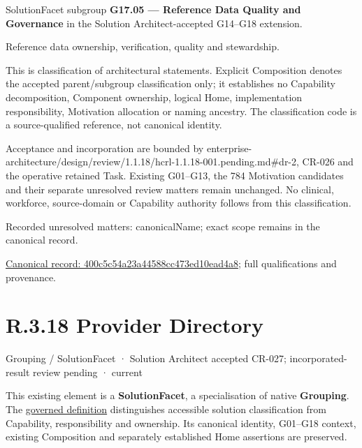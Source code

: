 SolutionFacet subgroup \textbf{G17.05 — Reference Data Quality and Governance} in the Solution Architect-accepted G14–G18 extension.



Reference data ownership, verification, quality and stewardship.



This is classification of architectural statements. Explicit Composition denotes the accepted parent/subgroup classification only; it establishes no Capability decomposition, Component ownership, logical Home, implementation responsibility, Motivation allocation or naming ancestry. The classification code is a source-qualified reference, not canonical identity.



Acceptance and incorporation are bounded by enterprise-architecture/design/review/1.1.18/hcrl-1.1.18-001.pending.md\#dr-2, CR-026 and the operative retained Task. Existing G01–G13, the 784 Motivation candidates and their separate unresolved review matters remain unchanged. No clinical, workforce, source-domain or Capability authority follows from this classification.


{\small Recorded unresolved matters: canonicalName; exact scope remains in the canonical record.}\par
{\footnotesize \href{../../../../../../../continuum/grouping/400c5c54a23a44588cc473ed10ead4a8.md}{Canonical record: 400c5c54a23a44588cc473ed10ead4a8}; full qualifications and provenance.}\par
\section*{R.3.18 Provider Directory}
\label{navigation:R.3.18}

\label{element:0233415953ed487fbbe407ebb469e7bc}
{\small Grouping / SolutionFacet · Solution Architect accepted CR-027; incorporated-result review pending · current}\par

This existing element is a \textbf{SolutionFacet}, a specialisation of native
\textbf{Grouping}. The \href{\detokenize{../../../../../../../governance/continuum-representation.md#solutionfacet-classification--1119-candidate}}{governed definition}
distinguishes accessible solution classification from Capability, responsibility
and ownership. Its canonical identity, G01–G18 context, existing Composition
and separately established Home assertions are preserved.



